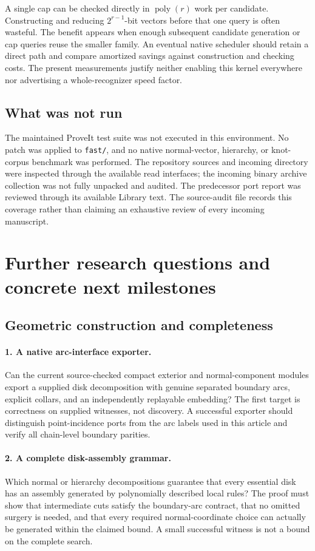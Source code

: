 \documentclass[11pt,a4paper]{article}
\theoremstyle{definition}
\theoremstyle{remark}
\newcommand{\poly}{\operatorname{poly}}
\begin{document}
A single cap can be checked directly in $\poly(r)$ work per candidate. Constructing
and reducing $2^{r-1}$-bit vectors before that one query is often wasteful. The
benefit appears when enough subsequent candidate generation or cap queries reuse the
smaller family. An eventual native scheduler should retain a direct path and compare
amortized savings against construction and checking costs. The present measurements
justify neither enabling this kernel everywhere nor advertising a whole-recognizer
speed factor.

\subsection{What was not run}
The maintained ProveIt test suite was not executed in this environment. No patch was
applied to \texttt{fast/}, and no native normal-vector, hierarchy, or knot-corpus
benchmark was performed. The repository sources and incoming directory were inspected
through the available read interfaces; the incoming binary archive collection was not
fully unpacked and audited. The predecessor port report was reviewed through its
available Library text. The source-audit file records this coverage rather than
claiming an exhaustive review of every incoming manuscript.

\section{Further research questions and concrete next milestones}\label{sec:future}
\subsection{Geometric construction and completeness}
\paragraph{1. A native arc-interface exporter.}
Can the current source-checked compact exterior and normal-component modules export a
supplied disk decomposition with genuine separated boundary arcs, explicit collars,
and an independently replayable embedding? The first target is correctness on supplied
witnesses, not discovery. A successful exporter should distinguish point-incidence ports
from the arc labels used in this article and verify all chain-level boundary parities.

\paragraph{2. A complete disk-assembly grammar.}
Which normal or hierarchy decompositions guarantee that every essential disk has an
assembly generated by polynomially described local rules? The proof must show that
intermediate cuts satisfy the boundary-arc contract, that no omitted surgery is needed,
and that every required normal-coordinate choice can actually be generated within the
claimed bound. A small successful witness is not a bound on the complete search.
\end{document}
